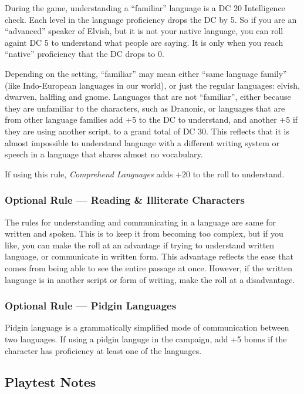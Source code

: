 \documentclass[twocolumn]{dndbook}
\begin{document}
During the game, understanding a ``familiar'' language is a DC 20 Intelligence check.
Each level in the language proficiency drops the DC by 5.
So if you are an ``advanced'' speaker of Elvish, but it is not your native language,
you can roll againt DC 5 to understand what people are saying.
It is only when you reach ``native'' proficiency that the DC drops to 0.\par

Depending on the setting, ``familiar'' may mean either ``same language family'' (like Indo-European languages in our world),
or just the regular languages: elvish, dwarven, halfling and gnome. Languages that are not ``familiar'',
either because they are unfamiliar to the characters, such as Dranonic, or languages that are from other language families add +5 to the DC to understand,
and another +5 if they are using another script, to a grand total of DC 30.
This reflects that it is almost impossible to understand language with a different writing system or speech in a language that shares almost no vocabulary.\par

If using this rule, \emph{Comprehend Languages} adds +20 to the roll to understand.\par

\subsubsection{Optional Rule --- Reading \& Illiterate Characters}
The rules for understanding and communicating in a language are same for written and spoken.
This is to keep it from becoming too complex, but if you like, you can make the roll at an advantage if trying to understand written language, or communicate in written form.
This advantage reflects the ease that comes from being able to see the entire passage at once.
However, if the written language is in another script or form of writing, make the roll at a disadvantage.

\subsubsection{Optional Rule --- Pidgin Languages}
Pidgin language is a grammatically simplified mode of communication between two languages.
If using a pidgin languge in the campaign, add +5 bonus if the character has proficiency at least one of the languages.



\subsection{Playtest Notes}
\end{document}
